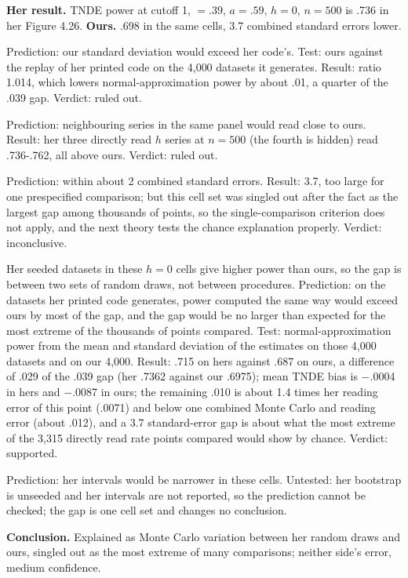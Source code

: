 \textbf{Her result.} TNDE power at cutoff 1, \cp{} $= .39$, $a = .59$, $h = 0$, $n = 500$ is .736 in her Figure 4.26. \textbf{Ours.} .698 in the same cells, 3.7 combined standard errors lower.
\begin{description}[leftmargin=1em,style=nextline]
\item[Our TNDE estimates are more variable (ours).] Prediction: our standard deviation would exceed her code's. Test: ours against the replay of her printed code on the 4,000 datasets it generates. Result: ratio 1.014, which lowers normal-approximation power by about .01, a quarter of the .039 gap. Verdict: ruled out.
\item[We misread her point (ours).] Prediction: neighbouring series in the same panel would read close to ours. Result: her three directly read $h$ series at $n = 500$ (the fourth is hidden) read .736-.762, all above ours. Verdict: ruled out.
\item[Monte Carlo noise in one prespecified comparison (neither).] Prediction: within about 2 combined standard errors. Result: 3.7, too large for one prespecified comparison; but this cell set was singled out after the fact as the largest gap among thousands of points, so the single-comparison criterion does not apply, and the next theory tests the chance explanation properly. Verdict: inconclusive.
\item[Her particular random draws (neither).] Her seeded datasets in these $h = 0$ cells give higher power than ours, so the gap is between two sets of random draws, not between procedures. Prediction: on the datasets her printed code generates, power computed the same way would exceed ours by most of the gap, and the gap would be no larger than expected for the most extreme of the thousands of points compared. Test: normal-approximation power from the mean and standard deviation of the estimates on those 4,000 datasets and on our 4,000. Result: .715 on hers against .687 on ours, a difference of .029 of the .039 gap (her .7362 against our .6975); mean TNDE bias is $-$.0004 in hers and $-$.0087 in ours; the remaining .010 is about 1.4 times her reading error of this point (.0071) and below one combined Monte Carlo and reading error (about .012), and a 3.7 standard-error gap is about what the most extreme of the 3,315 directly read rate points compared would show by chance. Verdict: supported.
\item[Her bootstrap differs in a detail from Appendix B (source).] Prediction: her intervals would be narrower in these cells. Untested: her bootstrap is unseeded and her intervals are not reported, so the prediction cannot be checked; the gap is one cell set and changes no conclusion.
\end{description}
\textbf{Conclusion.} Explained as Monte Carlo variation between her random draws and ours, singled out as the most extreme of many comparisons; neither side's error, medium confidence.

